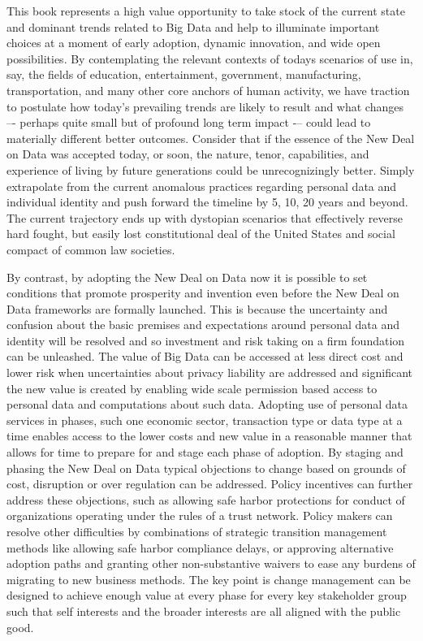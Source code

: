 This book represents a high value opportunity to take stock of the current state and dominant trends related to Big Data and help to illuminate important choices at a moment of early adoption, dynamic innovation, and wide open possibilities.
By contemplating the relevant contexts of todays scenarios of use in, say, the fields of education, entertainment, government, manufacturing, transportation, and many other core anchors of human activity, we have traction to postulate how today’s prevailing trends are likely to result and what changes –- perhaps quite small but of profound long term impact -– could lead to materially different better outcomes.
Consider that if the essence of the New Deal on Data was accepted today, or soon, the nature, tenor, capabilities, and experience of living by future generations could be unrecognizingly better.
Simply extrapolate from the current anomalous practices regarding personal data and individual identity and push forward the timeline by 5, 10, 20 years and beyond. The current trajectory ends up with dystopian scenarios that effectively reverse hard fought, but easily lost constitutional deal of the United States and social compact of common law societies.

By contrast, by adopting the New Deal on Data now it is possible to set conditions that promote prosperity and invention even before the New Deal on Data frameworks are formally launched.
This is because the uncertainty and confusion about the basic premises and expectations around personal data and identity will be resolved and so investment and risk taking on a firm foundation can be unleashed.
The value of Big Data can be accessed at less direct cost and lower risk when uncertainties about privacy liability are addressed and significant the new value is created by enabling wide scale permission based access to personal data and computations about such data.
Adopting use of personal data services in phases, such one economic sector, transaction type or data type at a time enables access to the lower costs and new value in a reasonable manner that allows for time to prepare for and stage each phase of adoption.
By staging and phasing the New Deal on Data typical objections to change based on grounds of cost, disruption or over regulation can be addressed.
Policy incentives can further address these objections, such as allowing safe harbor protections for conduct of organizations operating under the rules of a trust network.
Policy makers can resolve other difficulties by combinations of strategic transition management methods like allowing safe harbor compliance delays, or approving alternative adoption paths and granting other non-substantive waivers to ease any burdens of migrating to new business methods.  
The key point is change management can be designed to achieve enough value at every phase for every key stakeholder group such that self interests and the broader interests are all aligned with the public good. 

